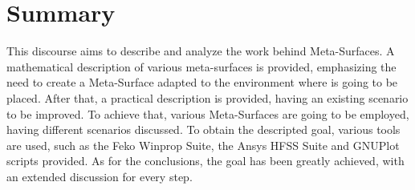 \newpage
\chapter*{Summary} %
\label{Summary}


This discourse aims to describe and analyze the work behind Meta-Surfaces. A mathematical description of various meta-surfaces is provided, emphasizing the need to create a Meta-Surface adapted to the environment where is going to be placed. After that, a practical description is provided, having an existing scenario to be improved. To achieve that, various Meta-Surfaces are going to be employed, having different scenarios discussed. To obtain the descripted goal, various tools are used, such as the Feko Winprop Suite, the Ansys HFSS Suite and GNUPlot scripts provided. As for the conclusions, the goal has been greatly achieved, with an extended discussion for every step.

